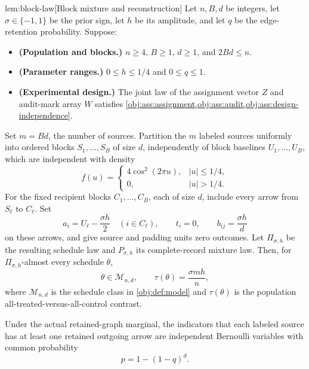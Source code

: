 \documentclass[11pt]{article}
\begin{document}
\begin{lemmav}{lem:block-law}[Block mixture and reconstruction]
Let \(n,B,d\) be integers, let \(\sigma\in\{-1,1\}\) be the prior sign, let \(h\) be its amplitude, and let \(q\) be the edge-retention probability. Suppose:
\begin{itemize}
\item \textbf{(Population and blocks.)} \(n\ge4\), \(B\ge1\), \(d\ge1\), and \(2Bd\le n\).
\item \textbf{(Parameter ranges.)} \(0\le h\le1/4\) and \(0\le q\le1\).
\item \textbf{(Experimental design.)} The joint law of the assignment vector \(Z\) and audit-mark array \(W\) satisfies \cref{obj:ass:assignment,obj:ass:audit,obj:ass:design-independence}.
\end{itemize}

Set \(m=Bd\), the number of sources. Partition the \(m\) labeled sources uniformly into ordered blocks \(S_1,\ldots,S_B\) of size \(d\), independently of block baselines \(U_1,\ldots,U_B\), which are independent with density
\[
f(u)=
\begin{cases}
4\cos^2(2\pi u),& |u|\le1/4,\\
0,& |u|>1/4.
\end{cases}
\]
For the fixed recipient blocks \(C_1,\ldots,C_B\), each of size \(d\), include every arrow from \(S_\ell\) to \(C_\ell\). Set
\[
a_i=U_\ell-\frac{\sigma h}{2}\quad(i\in C_\ell),
\qquad t_i=0,
\qquad b_{ij}=\frac{\sigma h}{d}
\]
on these arrows, and give source and padding units zero outcomes. Let \(\Pi_{\sigma,h}\) be the resulting schedule law and \(P_{\sigma,h}\) its complete-record mixture law. Then, for \(\Pi_{\sigma,h}\)-almost every schedule \(\theta\),
\[
\theta\in\mathcal M_{n,d},
\qquad
\tau(\theta)=\frac{\sigma mh}{n},
\]
where \(\mathcal M_{n,d}\) is the schedule class in \cref{obj:def:model} and \(\tau(\theta)\) is the population all-treated-versus-all-control contrast.

Under the actual retained-graph marginal, the indicators that each labeled source has at least one retained outgoing arrow are independent Bernoulli variables with common probability
\[
p=1-(1-q)^d.
\]


\end{lemmav}
\end{document}
